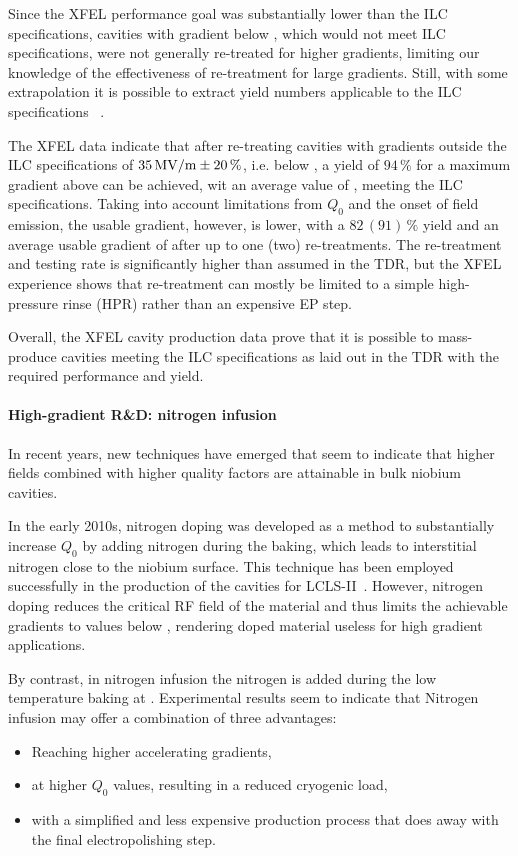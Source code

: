 Since the XFEL performance goal was substantially lower than the ILC specifications, cavities with gradient below , which would not meet ILC specifications, were not generally re-treated for higher gradients, limiting our knowledge of the effectiveness of re-treatment for large gradients.
Still, with some extrapolation it is possible to extract yield numbers applicable to the ILC specifications ~\cite{bib:Walker:2017.lcws}.

The XFEL data indicate that after re-treating cavities with gradients outside the ILC specifications of $35\,{\mathrm{MV/m}} \pm 20\,\%$, i.e. below , a yield of $94\,\%$ for a maximum gradient above  can be achieved, wit an average value of , meeting the ILC specifications.
Taking into account limitations from $Q_0$ and the onset of field emission, the usable gradient, however, is lower, with a $82\,(91)\,\%$ yield and an average usable gradient of  after up to one (two) re-treatments.
The re-treatment and testing rate is significantly higher than assumed in the TDR, but the XFEL experience shows that re-treatment can mostly be limited to a simple high-pressure rinse (HPR) rather than an expensive EP step.  

Overall, the XFEL cavity production data prove that it is possible to mass-produce cavities meeting the ILC specifications as laid out in the TDR with the required performance and yield.


\paragraph{High-gradient R\&D: nitrogen infusion}

In recent years, new techniques have emerged that seem to indicate that higher fields combined with higher quality factors are attainable in bulk niobium cavities.

In the early 2010s, nitrogen doping was developed as a method to substantially increase $Q_0$ by adding nitrogen during the  baking, which leads to interstitial nitrogen close to the niobium surface.
This technique has been employed successfully in the production of the cavities for LCLS-II~\cite{XXX}.
However, nitrogen doping reduces the critical RF field of the material and thus limits the achievable gradients to values below , rendering doped material useless for high gradient applications.

By contrast, in nitrogen infusion the nitrogen is added during the low temperature baking at .
Experimental results seem to indicate that Nitrogen infusion may offer a combination of three advantages:
\begin{itemize}
\item Reaching higher accelerating gradients,
\item at higher $Q_0$ values, resulting in a reduced cryogenic load, 
\item with a simplified and less expensive production process that does away with the final electropolishing step.
\end{itemize}

